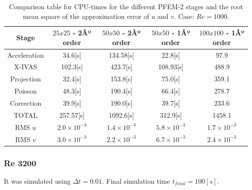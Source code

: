 \documentclass[a4paper,conference]{IEEEtran}
\begin{document}
\begin{table}[htbp]
\begin{center}
{\footnotesize
\begin{tabular}[h]{||c|c|c|c|c||}
    \hline
      Stage & $25x25$ - 2Âº order & $50x50$  - 2Âº order & $50x50$ - 1Âº order & $100x100$ - 1Âº order\\
      \hline
      \hline
	Acceleration & 34.6[s]& 134.58[s]& 22.8[s] & 97.9\\
	X-IVAS & 102.3[s]& 423.7[s]& 108.93[s] & 488.9 \\
	Projection & 32.4[s]& 153.8[s]& 75.0[s] & 359.1\\
	Poisson & 48.3[s]& 190.4[s]& 66.4[s] & 278.7\\
	Correction & 39.9[s]& 190.0[s]& 39.7[s] & 233.6\\
      \hline
	TOTAL & 257.57[s]& 1092.6[s]& 312.9[s] & 1458.1\\
      \hline
      \hline
	RMS $u$ & $2.0\times10^{-3}$ & $1.4\times10^{-3}$ & $5.8\times10^{-3}$ & $1.7\times10^{-3}$ \\
	RMS $v$ & $3.0\times10^{-3}$ & $2.2\times10^{-3}$ & $6.7\times10^{-3}$ & $2.4\times10^{-3}$ \\
      \hline
      \hline
\end{tabular}
}
\caption{\label{Tabla:times_Re_1000} Comparison table for CPU-times for the different PFEM-2 stages and the root mean square of the approximation error of $u$ and $v$. Case: $Re=1000$.}
\end{center}
\end{table}

\newpage

\subsubsection{Re 3200}


It was simulated using $\Delta t = 0.01$. Final simulation time $t_{final} = 100[s]$.
\end{document}
